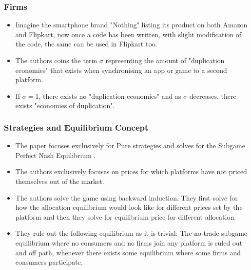 \documentclass[11pt]{beamer}
\theoremstyle{boldstyle}
\begin{document}
		\begin{frame}
	\frametitle{Firms }
	\begin{small}
		\begin{itemize}
			\item Imagine the smartphone brand "Nothing" listing its product on both Amazon and Flipkart, now once a code has been written, with slight modification of the code, the same can be used in Flipkart too.  
			\item  The authors coins the term $\sigma$ representing the amount of "duplication economies" that exists when synchronising an app or game to a second platform.
			\item If $\sigma=1$, there exists no "duplication economies" and as $\sigma$ decreases, there exists "economies of duplication".
			
		\end{itemize}
	\end{small}
\end{frame}


		\begin{frame}
	\frametitle{Strategies and Equilibrium Concept}
	\begin{small}
		\begin{itemize}
			\item The paper focuses exclusively for Pure strategies and solves for the Subgame Perfect Nash Equilibrium . 
			\item  The authors exclusively focuses on prices  for which platforms have  not priced themselves out of the market. 
			\item The authors solve the game using backward induction. They first solve for how the allocation equilibrium would look like for different prices set by the platform and then they solve for equilibrium price for different allocation.
			\item They rule out the following equilibrium as it is trivial: The no-trade subgame equilibrium where no consumers and no firms join any platform is ruled out and off path, whenever there exists some equilibrium where some firms and consumers participate. 
			
			
		\end{itemize}
	\end{small}
\end{frame}
\end{document}
